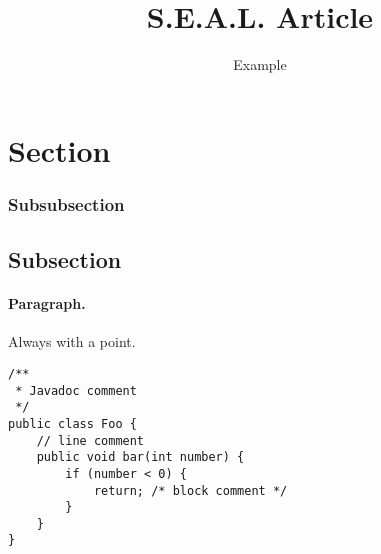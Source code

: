 \documentclass{seal_article}
\title{S.E.A.L. Article}
\subtitle{Example}
\begin{document}
\maketitle

\section{Section}
%
\subsubsection{Subsubsection}

\subsection{Subsection}
%
\paragraph{Paragraph.} Always with a point.

\begin{lstlisting}[caption=An example code snippet]
/**
 * Javadoc comment
 */
public class Foo {
	// line comment
	public void bar(int number) {
		if (number < 0) {
			return; /* block comment */
		}
	}
}
\end{lstlisting}



\end{document}
